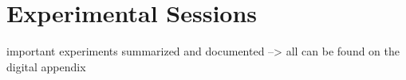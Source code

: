 \section{Experimental Sessions}\label{sec:Sessions}

important experiments summarized and documented
--> all can be found on the digital appendix